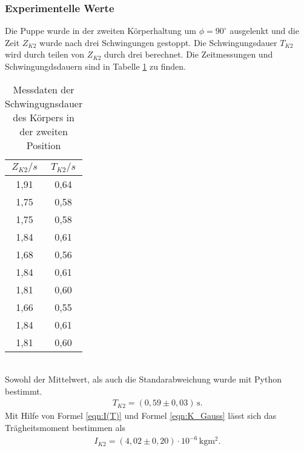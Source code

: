 \subsubsection{Experimentelle Werte}
Die Puppe wurde in der zweiten Körperhaltung um $\phi = 90^{\circ}$ ausgelenkt und die Zeit $Z_{K2}$
wurde nach drei Schwingungen gestoppt. Die Schwingungsdauer $T_{K2}$ wird durch teilen von $Z_{K2}$
durch drei berechnet. Die Zeitmessungen und Schwingungdsdauern sind in Tabelle \ref{tab:Koerper2} zu finden.
\begin{table}
  \centering
  \caption{Messdaten der Schwingugnsdauer des Körpers in der zweiten Position}
  \label{tab:Koerper2}
  \begin{tabular}{c c}
    \toprule
    $Z_{K2}/s$ & $T_{K2}/s$ \\
    \midrule
    1,91 & 0,64 \\
    1,75 & 0,58 \\
    1,75 & 0,58 \\
    1,84 & 0,61 \\
    1,68 & 0,56 \\
    1,84 & 0,61 \\
    1,81 & 0,60 \\
    1,66 & 0,55 \\
    1,84 & 0,61 \\
    1,81 & 0,60 \\
    \bottomrule
  \end{tabular}
\end{table}
\\
Sowohl der Mittelwert, als auch die Standarabweichung wurde mit Python bestimmt.
\begin{align*}
  T_{K2} = (0{,}59 \pm 0{,}03)\, \mathrm{s} .
\end{align*}
Mit Hilfe von Formel \ref{eqn:I(T)} und Formel \ref{eqn:K_Gauss} lässt sich das Trägheitsmoment bestimmen als
\begin{align*}
  I_{K2} = (4{,}02 \pm 0{,}20) \cdot 10^{-6}\, \mathrm{kgm^2}.
\end{align*}